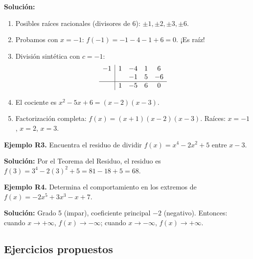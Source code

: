 \documentclass[12pt, a4paper]{article}
\begin{document}
\begin{cuadrosolucion}
  \textbf{Solución:}
  \begin{enumerate}
    \item Posibles raíces racionales (divisores de 6): $\pm 1, \pm 2, \pm 3, \pm 6$.
    \item Probamos con $x = -1$: $f(-1) = -1 - 4 - 1 + 6 = 0$. ¡Es raíz!
    \item División sintética con $c = -1$:
          \[
            \begin{array}{c|cccc}
              -1 & 1 & -4 & 1 & 6  \\
                 &   & -1 & 5 & -6 \\
              \hline
                 & 1 & -5 & 6 & 0  \\
            \end{array}
          \]
    \item El cociente es $x^2 - 5x + 6 = (x - 2)(x - 3)$.
    \item Factorización completa: $f(x) = (x + 1)(x - 2)(x - 3)$. Raíces: $x = -1$, $x = 2$, $x = 3$.
  \end{enumerate}
\end{cuadrosolucion}

\textbf{Ejemplo R3.} Encuentra el residuo de dividir $f(x) = x^4 - 2x^2 + 5$ entre $x - 3$.

\begin{cuadrosolucion}
  \textbf{Solución:} Por el Teorema del Residuo, el residuo es $f(3) = 3^4 - 2(3)^2 + 5 = 81 - 18 + 5 = 68$.
\end{cuadrosolucion}

\textbf{Ejemplo R4.} Determina el comportamiento en los extremos de $f(x) = -2x^5 + 3x^3 - x + 7$.

\begin{cuadrosolucion}
  \textbf{Solución:} Grado 5 (impar), coeficiente principal $-2$ (negativo). Entonces: cuando $x \to +\infty$, $f(x) \to -\infty$; cuando $x \to -\infty$, $f(x) \to +\infty$.
\end{cuadrosolucion}

\subsection{Ejercicios propuestos}
\end{document}

